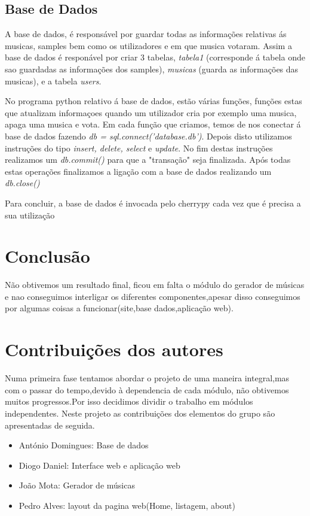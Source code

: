\documentclass{report}
\begin{document}
\section{Base de Dados}
\label{sec.Base de Dados}

A base de dados, é responsável por guardar todas as informações relativas ás musicas, samples bem como os utilizadores e em que musica votaram. Assim a base de dados é responável por criar 3 tabelas, \textit{tabela1} (corresponde á tabela onde sao guardadas as informações dos samples), \textit{musicas} (guarda as informações das musicas), e a tabela \textit{users}.

No programa python relativo á base de dados, estão várias funções, funções estas que atualizam informaçoes quando um utilizador cria por exemplo uma musica, apaga uma musica e vota. Em cada função que criamos, temos de nos conectar á base de dados fazendo \textit{db = sql.connect('database.db')}. Depois disto utilizamos instruções do tipo \textit{insert, delete, select}  e \textit{update}. No fim destas instruções realizamos um \textit{db.commit()} para que a "transação" seja finalizada. Após todas estas operações finalizamos a ligação com a base de dados realizando um \textit{db.close()}

Para concluir, a base de dados é invocada pelo cherrypy cada vez que é precisa a sua utilização

\chapter{Conclusão}
\label{chap.Conclusão}
Não obtivemos um resultado final, ficou em falta o módulo do gerador de músicas e nao conseguimos interligar os diferentes componentes,apesar disso conseguimos por algumas coisas a funcionar(site,base dados,aplicação web).
\chapter{Contribuições dos autores}
\label{Contribuições dos autores}
Numa primeira fase tentamos abordar o projeto de uma maneira integral,mas com o passar do tempo,devido à dependencia de cada módulo, não obtivemos muitos progressos.Por isso decidimos dividir o trabalho em módulos independentes.
Neste projeto as contribuições dos elementos do grupo são apresentadas de seguida.

\begin{itemize}
\item António Domingues: Base de dados
\item Diogo Daniel: Interface web e aplicação web
\item João Mota: Gerador de músicas 
\item Pedro Alves: layout da pagina web(Home, listagem, about)
\end{itemize}
\end{document}
